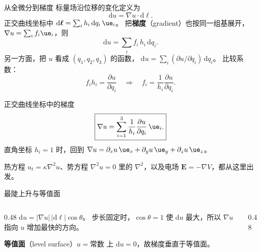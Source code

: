 \documentclass[fontset=windows, chinese, 10pt, xcolor=dvipsnames]{beamer}
\begin{document}
\begin{frame}{从全微分到梯度}
  标量场沿位移的变化定义为
  \begin{equation*}
    \mathrm{d}u=\nabla u\cdot\mathrm{d}\boldsymbol{\ell}.
  \end{equation*}
  正交曲线坐标中
  $\mathrm{d}\boldsymbol{\ell}=\sum_i h_i\,\mathrm{d}q_i\,\ue_i$。
  把\textbf{梯度}（gradient）也按同一组基展开，$\nabla u=\sum_i f_i\ue_i$，则
  \begin{equation*}
    \mathrm{d}u
    =\sum_i f_i\,h_i\,\mathrm{d}q_i.
  \end{equation*}
  另一方面，把 $u$ 看成 $(q_1,q_2,q_3)$ 的函数，
  $\mathrm{d}u=\sum_i(\partial u/\partial q_i)\,\mathrm{d}q_i$。
  比较系数：
  \begin{equation*}
    f_i h_i=\frac{\partial u}{\partial q_i}
    \quad\Rightarrow\quad
    f_i=\frac{1}{h_i}\frac{\partial u}{\partial q_i}.
  \end{equation*}
\end{frame}

\begin{frame}{正交曲线坐标中的梯度}
  \begin{equation*}
    \boxed{\displaystyle
      \nabla u
      =\sum_{i=1}^{3}\frac{1}{h_i}\frac{\partial u}{\partial q_i}\,\ue_i.}
  \end{equation*}
  直角坐标 $h_i=1$ 时，回到
  $\nabla u=\partial_x u\,\ue_x+\partial_y u\,\ue_y+\partial_z u\,\ue_z$。
  \vspace{0.3em}

  热方程 $u_t=\kappa\nabla^2 u$、势方程 $\nabla^2 u=0$ 里的 $\nabla^2$，以及电场 $\mathbf{E}=-\nabla V$，都从这里出发。
\end{frame}

\begin{frame}{最陡上升与等值面}
  \begin{columns}[c]
    \begin{column}{0.48\textwidth}
      $\mathrm{d}u=|\nabla u|\,|\mathrm{d}\boldsymbol{\ell}|\cos\theta$。
      步长固定时，$\cos\theta=1$ 使 $\mathrm{d}u$ 最大，所以 $\nabla u$ 指向 $u$ 增加最快的方向。
      \vspace{0.3em}

      \textbf{等值面}（level surface）$u=\textrm{常数}$ 上 $\mathrm{d}u=0$，故梯度垂直于等值面。
    \end{column}
    \begin{column}{0.48\textwidth}
      \centering
      
    \end{column}
  \end{columns}
\end{frame}
\end{document}
